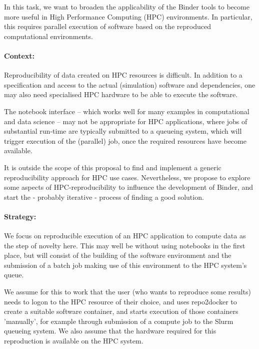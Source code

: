 \begin{task}[
  title=Binder at HPC facilities,
  id=binder-at-hpc,
  lead=MP,
  PM=17,
  partners={IFR,UIO}
]
In this task, we want to broaden the applicability of the Binder tools to become
more useful in High Performance Computing (HPC) environments. In particular, this
requires parallel execution of software based on the reproduced computational environments.

\paragraph*{Context:}
Reproducibility of data created on HPC resources is difficult. In addition to
a specification and access to the actual (simulation) software and dependencies,
one may also need specialised HPC hardware to be able to execute the software.

The notebook interface -- which works well for many examples in computational and
data science -- may not be appropriate for HPC applications, where jobs of
substantial run-time are typically submitted to a queueing system, which will
trigger execution of the (parallel) job, once the required resources have become
available.

It is outside the scope of this proposal to find and implement a generic
reproducibility approach for HPC use cases. Nevertheless, we propose to explore
some aspects of HPC-reproducibility to influence the development of Binder,
and start the - probably iterative - process of finding a good solution.

\paragraph*{Strategy:}
We focus on reproducible execution of an HPC application to compute data as the step of
novelty here. This may well be without using notebooks in the first place, but will consist of the
building of the software environment and the submission of a batch job making use of this
environment to the HPC system's queue.

We assume for this to work that the user (who wants to reproduce some results)
needs to logon to the HPC resource of their choice, and uses repo2docker to
create a suitable software container, and starts execution of those containers
'manually', for example through submission of a compute job to the Slurm
queueing system. We also assume that the hardware required for this reproduction
is available on the HPC system.


\end{task}
